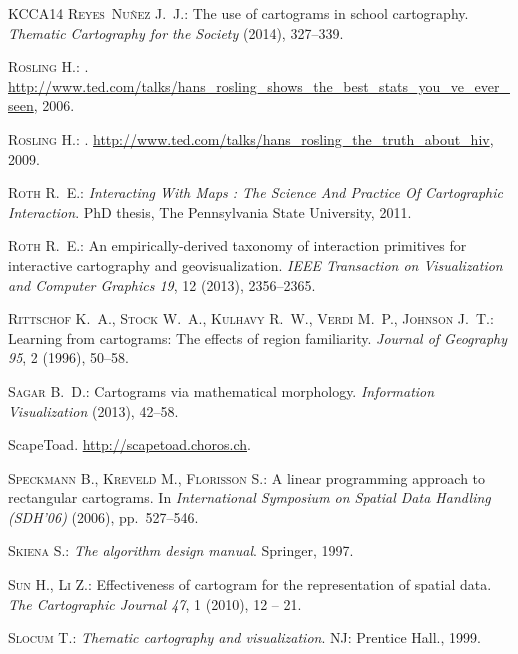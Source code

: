 \documentclass{egpubl}
\begin{document}
\begin{thebibliography}{\uppercase{KCCA{\etalchar{*}}14}}
\textsc{Reyes~Nu{\~n}ez J.~J.}:
\newblock The use of cartograms in school cartography.
\newblock \emph{Thematic Cartography for the Society} (2014), 327--339.

\textsc{Rosling H.}:
.
\newblock
  \url{http://www.ted.com/talks/hans_rosling_shows_the_best_stats_you_ve_ever_seen},
  2006.

\textsc{Rosling H.}:
.
\newblock \url{http://www.ted.com/talks/hans_rosling_the_truth_about_hiv},
  2009.

\textsc{Roth R.~E.}:
\newblock \emph{Interacting With Maps : The Science And Practice Of
  Cartographic Interaction}.
\newblock PhD thesis, The Pennsylvania State University, 2011.

\textsc{Roth R.~E.}:
\newblock An empirically-derived taxonomy of interaction primitives for
  interactive cartography and geovisualization.
\newblock \emph{{IEEE} Transaction on Visualization and Computer Graphics 19},
  12 (2013), 2356--2365.

\textsc{Rittschof K.~A., Stock W.~A., Kulhavy R.~W., Verdi M.~P., Johnson
  J.~T.}:
\newblock Learning from cartograms: The effects of region familiarity.
\newblock \emph{Journal of Geography 95}, 2 (1996), 50--58.

\textsc{Sagar B.~D.}:
\newblock Cartograms via mathematical morphology.
\newblock \emph{Information Visualization} (2013), 42--58.

{ScapeToad}.
\newblock \url{http://scapetoad.choros.ch}.

\textsc{Speckmann B., Kreveld M., Florisson S.}:
\newblock A linear programming approach to rectangular cartograms.
\newblock In \emph{International Symposium on Spatial Data Handling (SDH'06)}
  (2006), pp.~527--546.

\textsc{Skiena S.}:
\newblock \emph{The algorithm design manual}.
\newblock Springer, 1997.

\textsc{Sun H., Li Z.}:
\newblock Effectiveness of cartogram for the representation of spatial data.
\newblock \emph{The Cartographic Journal 47}, 1 (2010), 12 -- 21.

\textsc{Slocum T.}:
\newblock \emph{Thematic cartography and visualization}.
\newblock NJ: Prentice Hall., 1999.


\end{thebibliography}
\end{document}
